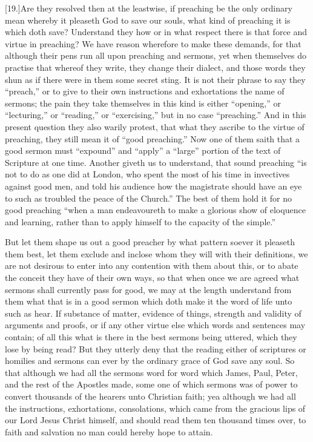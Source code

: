[19.]Are they resolved then at the leastwise, if preaching be the only ordinary mean whereby it pleaseth God to save our souls, what kind of preaching it is which doth save? Understand they how or in what respect there is that force and virtue in preaching? We have reason wherefore to make these demands, for that although their pens run all upon preaching and sermons, yet when themselves do practise that whereof they write, they change their dialect, and those words they shun as if there were in them some secret sting. It is not their phrase to say they “preach,” or to give to their own instructions and exhortations the name of sermons; the pain they take themselves in this kind is either “opening,” or “lecturing,” or “reading,” or “exercising,” but in no case “preaching.”  And in this present question they also warily protest, that what they ascribe to the virtue of preaching, they still mean it of “good preaching.” Now one of them saith that a good sermon must “expound” and “apply” a “large” portion of the text of Scripture at one time. Another giveth us to understand, that sound preaching “is not to do as one did at London, who spent the most of his time in invectives against good men, and told his audience how the magistrate should have an eye to such as troubled the peace of the Church.” The best of them hold it for no good preaching “when a man endeavoureth to make a glorious show of eloquence  and learning, rather than to apply himself to the capacity of the simple.”

But let them shape us out a good preacher by what pattern soever it pleaseth them best, let them exclude and inclose whom they will with their definitions, we are not desirous to enter into any contention with them about this, or to abate the conceit they have of their own ways, so that when once we are agreed what sermons shall currently pass for good, we may at the length understand from them what that is in a good sermon which doth make it the word of life unto such as hear. If substance of matter, evidence of things, strength and validity of arguments and proofs, or if any other virtue else which words and sentences may contain; of all this what is there in the best sermons being uttered, which they lose by being read? But they utterly deny that the reading either of scriptures or homilies and sermons can ever by the ordinary grace of God save any soul. So that although we had all the sermons word for word which James, Paul, Peter, and the rest of the Apostles made, some one of which sermons was of power to convert thousands of the hearers unto Christian faith; yea although we had all the instructions, exhortations, consolations, which came from the gracious lips of our Lord Jesus Christ himself, and should read them ten thousand times over, to faith and salvation no man could hereby hope to attain.

